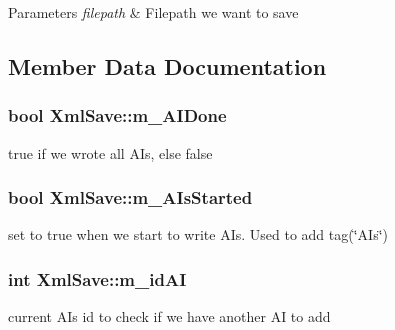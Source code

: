 \begin{DoxyParams}{Parameters}
{\em filepath} & Filepath we want to save \\
\hline
\end{DoxyParams}


\subsection{Member Data Documentation}
\hypertarget{class_xml_save_afb6a6d77bda66306dfac234dcae5248e}{}
\subsubsection[{m\+\_\+\+A\+I\+Done}]{\setlength{\rightskip}{0pt plus 5cm}bool Xml\+Save\+::m\+\_\+\+A\+I\+Done\hspace{0.3cm}{\ttfamily [private]}}\label{class_xml_save_afb6a6d77bda66306dfac234dcae5248e}
true if we wrote all A\+Is, else false \hypertarget{class_xml_save_a29c99f1952be494ebe9fa73275a3e9cc}{}
\subsubsection[{m\+\_\+\+A\+Is\+Started}]{\setlength{\rightskip}{0pt plus 5cm}bool Xml\+Save\+::m\+\_\+\+A\+Is\+Started\hspace{0.3cm}{\ttfamily [private]}}\label{class_xml_save_a29c99f1952be494ebe9fa73275a3e9cc}
set to true when we start to write A\+Is. Used to add tag(\char`\"{}\+A\+Is\char`\"{}) \hypertarget{class_xml_save_a13de35f1c25f9d3a0261b08dd9c915ee}{}
\subsubsection[{m\+\_\+id\+A\+I}]{\setlength{\rightskip}{0pt plus 5cm}int Xml\+Save\+::m\+\_\+id\+A\+I\hspace{0.3cm}{\ttfamily [private]}}\label{class_xml_save_a13de35f1c25f9d3a0261b08dd9c915ee}
current A\+I\textquotesingle{}s id to check if we have another A\+I to add \hypertarget{class_xml_save_a35dfc6619f277f16c41b53125036da0e}{}
